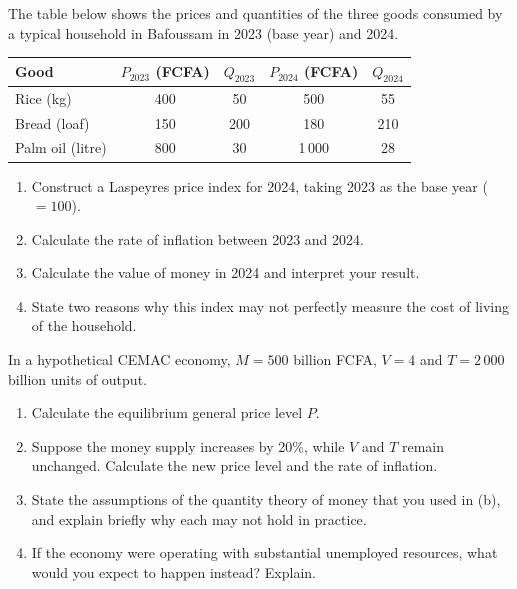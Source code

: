 \documentclass[11pt]{article}
\newcounter{popsec}
\newcounter{popsub}
\newcommand{\courssub}[1]{%
  \stepcounter{popsub}%
  \par\vspace{9pt}\noindent{\popxbold\fontsize{11.5}{13}\selectfont\color{popink}{\color{poporange}\thepopsec.\thepopsub}\hspace{6pt}#1}\par\nopagebreak\vspace{4pt}
}
\begin{document}
\courssub{I practise}

\begin{exercice}
The table below shows the prices and quantities of the three goods consumed by a typical household in Bafoussam in 2023 (base year) and 2024.
\begin{center}
\begin{tabular}{|l|c|c|c|c|}
\hline
\rowcolor{popblueL} Good & $P_{2023}$ (FCFA) & $Q_{2023}$ & $P_{2024}$ (FCFA) & $Q_{2024}$ \\
\hline
Rice (kg) & 400 & 50 & 500 & 55 \\
\hline
Bread (loaf) & 150 & 200 & 180 & 210 \\
\hline
Palm oil (litre) & 800 & 30 & 1\,000 & 28 \\
\hline
\end{tabular}
\end{center}
\begin{enumerate}
\item Construct a Laspeyres price index for 2024, taking 2023 as the base year ($= 100$).
\item Calculate the rate of inflation between 2023 and 2024.
\item Calculate the value of money in 2024 and interpret your result.
\item State two reasons why this index may not perfectly measure the cost of living of the household.
\end{enumerate}
\end{exercice}

\begin{exercice}
In a hypothetical CEMAC economy, $M = 500$ billion FCFA, $V = 4$ and $T = 2\,000$ billion units of output.
\begin{enumerate}
\item Calculate the equilibrium general price level $P$.
\item Suppose the money supply increases by 20\%, while $V$ and $T$ remain unchanged. Calculate the new price level and the rate of inflation.
\item State the assumptions of the quantity theory of money that you used in (b), and explain briefly why each may not hold in practice.
\item If the economy were operating with substantial unemployed resources, what would you expect to happen instead? Explain.
\end{enumerate}
\end{exercice}
\end{document}
